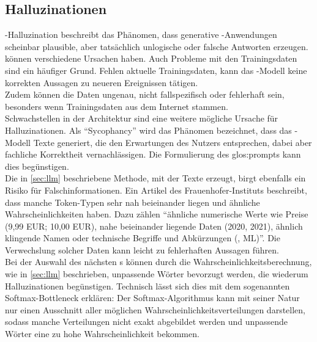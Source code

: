 \documentclass[../main.tex]{subfiles}
\begin{document}
\subsection{Halluzinationen}
 -Halluzination beschreibt 
das Phänomen, dass generative -Anwendungen scheinbar plausible, aber tatsächlich unlogische oder falsche Antworten erzeugen\cite{hallucinationForewarning}.\\
 können verschiedene Ursachen haben. Auch Probleme mit den Trainingsdaten sind ein häufiger Grund. Fehlen aktuelle Trainingsdaten, kann das -Modell keine korrekten Aussagen zu neueren Ereignissen tätigen.\\ 
Zudem können die Daten ungenau, nicht fallspezifisch oder fehlerhaft sein, besonders wenn Trainingsdaten aus dem Internet stammen.\\ 
Schwachstellen in der Architektur sind eine weitere mögliche Ursache für Halluzinationen. Als "`Sycophancy"' wird das Phänomen bezeichnet, dass das -Modell Texte 
generiert, die den Erwartungen des Nutzers entsprechen, dabei aber fachliche Korrektheit vernachlässigen. Die Formulierung des \gls{glos:prompt}s kann dies begünstigen.\cite{allgemHalluzinationen} \\
Die in \autoref{sec:llm} beschriebene Methode, mit der  Texte erzeugt, birgt ebenfalls ein Risiko für Falschinformationen. Ein Artikel des Frauenhofer-Instituts beschreibt, dass manche Token-Typen sehr nah beieinander liegen 
und ähnliche Wahrscheinlichkeiten haben. Dazu zählen "`ähnliche numerische Werte wie Preise (9,99 EUR; 10,00 EUR), nahe beieinander liegende Daten (2020, 2021), ähnlich klingende Namen oder 
technische Begriffe und Abkürzungen (, ML)"'\cite{halluzinationenFraunhofer}. Die Verwechslung solcher Daten kann leicht zu fehlerhaften Aussagen führen.\\
Bei der Auswahl des nächsten s können durch die Wahrscheinlichkeitsberechnung, wie in \autoref{sec:llm}  beschrieben, unpassende Wörter bevorzugt werden, die wiederum Halluzinationen 
begünstigen. Technisch lässt sich dies mit dem sogenannten Softmax-Bottleneck erklären: Der Softmax-Algorithmus kann mit seiner Natur nur einen Ausschnitt aller möglichen 
Wahrscheinlichkeitsverteilungen darstellen, sodass manche Verteilungen nicht exakt abgebildet werden und unpassende Wörter eine zu hohe Wahrscheinlichkeit bekommen.\cite{softmax} \\
\end{document}
